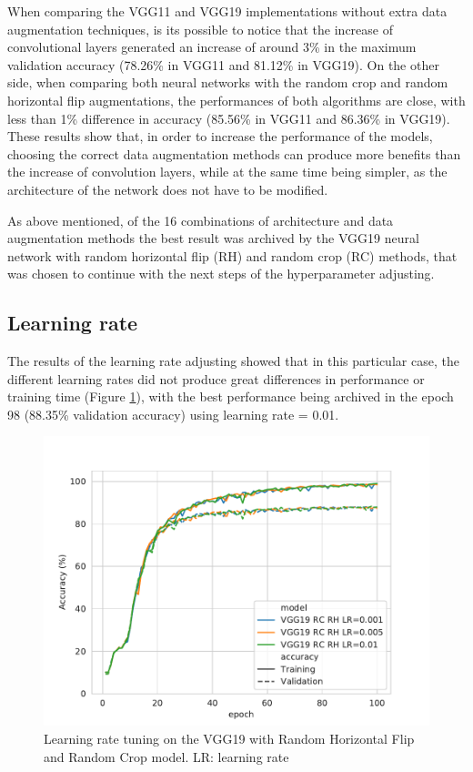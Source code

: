 \documentclass[10pt,twocolumn,letterpaper]{article}
\begin{document}
When comparing the VGG11 and VGG19 implementations without extra data augmentation techniques, is its possible to notice that the increase of convolutional layers generated an increase of around 3\% in the maximum validation accuracy (78.26\% in VGG11 and 81.12\% in VGG19). On the other side, when comparing both neural networks with the random crop and random horizontal flip augmentations, the performances of both algorithms are close, with less than 1\% difference in accuracy (85.56\% in VGG11 and 86.36\% in VGG19). These results show that, in order to increase the performance of the models, choosing the correct data augmentation methods can produce more benefits than the increase of convolution layers, while at the same time being simpler, as the architecture of the network does not have to be modified.

As above mentioned, of the 16 combinations of architecture and data augmentation methods the best result was archived by the VGG19 neural network with random horizontal flip (RH) and random crop (RC) methods, that was chosen to continue with the next steps of the hyperparameter adjusting.

\subsection{Learning rate}

The results of the learning rate adjusting showed that in this particular case, the different learning rates did not produce great differences in performance or training time (Figure \ref{fig:lr}), with the best performance being archived in the epoch 98 (88.35\% validation accuracy) using learning rate = 0.01.

\begin{figure}[h]
	\begin{center}
		\includegraphics[width=1.0\linewidth]{vgg19_lr.pdf}
	\end{center}
	\caption{Learning rate tuning on the VGG19 with Random Horizontal Flip and Random Crop model. LR: learning rate}
	\label{fig:lr}
\end{figure}
\end{document}
